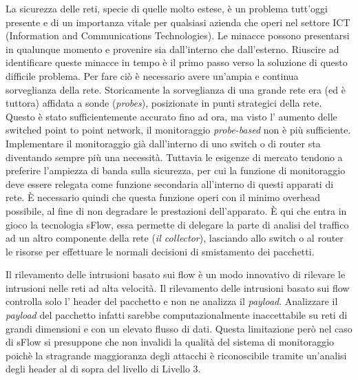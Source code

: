 \documentclass[12pt,a4paper,openright,twoside]{report}
\begin{document}
La sicurezza delle reti, specie di quelle molto estese, \`e un problema tutt'oggi
presente e di un importanza vitale per qualsiasi azienda che operi nel settore ICT (Information and Communications Technologies).
Le minacce possono presentarsi in qualunque momento \cite{K3} e provenire sia dall'interno
che dall'esterno. Riuscire ad identificare queste minacce in tempo \`e il primo passo verso la soluzione di
questo difficile problema. Per fare ci\`o \`e necessario avere un'ampia e continua
sorveglianza della rete.
Storicamente la sorveglianza di una grande rete era (ed \`e tuttora) affidata a sonde ({\it probes}),
posizionate in punti strategici della rete. Questo \`e stato sufficientemente accurato
fino ad ora, ma visto l' aumento delle switched point to point network, il monitoraggio {\it probe-based} non
\`e pi\`u sufficiente.
Implementare il monitoraggio gi\`a dall'interno di uno switch o di router sta
diventando sempre pi\`u una necessit\`a. Tuttavia le esigenze di mercato tendono a preferire
l'ampiezza di banda sulla sicurezza, per cui la funzione di monitoraggio deve essere relegata come
funzione secondaria all'interno di questi apparati di rete. \`E necessario quindi che questa funzione
operi con il minimo overhead possibile, al fine di non degradare le prestazioni dell'apparato.
\`E qui che entra in gioco la tecnologia sFlow, essa permette di delegare la parte di analisi del traffico
ad un altro componente della rete ({\it il collector}), lasciando allo switch o al router le risorse per
effettuare le normali decisioni di smistamento dei pacchetti.

Il rilevamento delle intrusioni basato sui flow \`e un modo innovativo di rilevare
le intrusioni nelle reti ad alta velocit\`a. Il rilevamento delle intrusioni basato
sui flow controlla solo l' header del pacchetto e non ne analizza il {\it payload}.
Analizzare il {\it payload} del pacchetto infatti sarebbe computazionalmente inaccettabile
su reti di grandi dimensioni e con un elevato flusso di dati. Questa limitazione per\`o
nel caso di sFlow si presuppone che non invalidi la qualit\`a del sistema di monitoraggio
poich\`e la stragrande maggioranza degli attacchi \`e riconoscibile tramite un'analisi
degli header al di sopra del livello di Livello 3.
\end{document}
